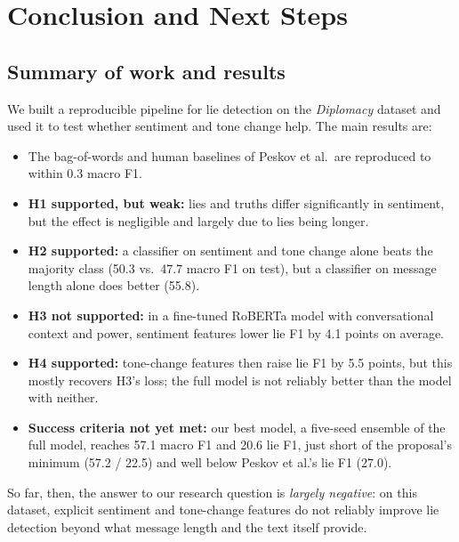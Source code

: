 \documentclass[conference]{IEEEtran}
\begin{document}
\section{Conclusion and Next Steps}
\label{sec:conclusion}

\subsection{Summary of work and results}
We built a reproducible pipeline for lie detection on the \textit{Diplomacy} dataset and used it to test whether sentiment and tone change help. The main results are:
\begin{itemize}
\item The bag-of-words and human baselines of Peskov et al.\ are reproduced to within 0.3 macro F1.
\item \textbf{H1 supported, but weak:} lies and truths differ significantly in sentiment, but the effect is negligible and largely due to lies being longer.
\item \textbf{H2 supported:} a classifier on sentiment and tone change alone beats the majority class (50.3 vs.\ 47.7 macro F1 on test), but a classifier on message length alone does better (55.8).
\item \textbf{H3 not supported:} in a fine-tuned RoBERTa model with conversational context and power, sentiment features lower lie F1 by 4.1 points on average.
\item \textbf{H4 supported:} tone-change features then raise lie F1 by 5.5 points, but this mostly recovers H3's loss; the full model is not reliably better than the model with neither.
\item \textbf{Success criteria not yet met:} our best model, a five-seed ensemble of the full model, reaches 57.1 macro F1 and 20.6 lie F1, just short of the proposal's minimum (57.2 / 22.5) and well below Peskov et al.'s lie F1 (27.0).
\end{itemize}
So far, then, the answer to our research question is \emph{largely negative}: on this dataset, explicit sentiment and tone-change features do not reliably improve lie detection beyond what message length and the text itself provide.
\end{document}
